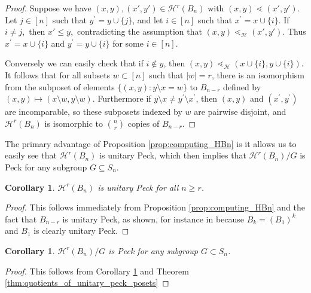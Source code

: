 \documentclass[10 pt]{amsart}
\theoremstyle{plain}
\newtheorem{cor}[thm]{Corollary}
\theoremstyle{definition}
\theoremstyle{remark}
\numberwithin{equation}{section}
\begin{document}
\begin{proof}

Suppose we have $(x, y),(x', y') \in \mathcal H^r(B_n)$ with $(x, y) \lessdot (x', y').$ Let $j\in [n]$ such that $y^\prime = y\cup\{j\}$, and let $i\in [n]$ such that $x^\prime = x\cup \{i\}$. If $i \ne j,$ then $x' \leq y,$ contradicting the assumption that $(x, y) \lessdot_{\mathcal H} (x', y').$ Thus $x^\prime = x\cup\{i\}$ and $y^\prime = y\cup\{i\}$ for some $i\in [n]$.

Conversely we can easily check that if $i\not\in y$, then $(x, y)\lessdot_{\mathcal{H}} (x\cup\{i\}, y\cup\{i\})$.  It follows that for all subsets $w\subset [n]$ such that $|w| = r$, there is an isomorphism from the subposet of elements $\{(x, y)\colon y\setminus x = w\}$ to $B_{n-r}$ defined by $(x,y)\mapsto (x\setminus w,y\setminus w)$.  Furthermore if $y\setminus x \ne y^\prime \setminus x^\prime$, then $(x, y)$ and $(x^\prime, y^\prime)$ are incomparable, so these subposets indexed by $w$ are pairwise disjoint, and $\mathcal{H}^r(B_n)$ is isomorphic to $\binom{n}{r}$ copies of $B_{n-r}$.
\end{proof}



The primary advantage of Proposition \ref{prop:computing_HBn} is it allows us to easily see that $\mathcal{H}^r(B_n)$ is unitary Peck, which then implies that $\mathcal{H}^r(B_n)/G$ is Peck for any subgroup $G\subseteq S_n$.


\begin{cor}\label{cor:HBn_unitary_peck}
$\mathcal{H}^r(B_n)$ is unitary Peck for all $n\ge r$.
\end{cor}

\begin{proof}
This follows immediately from Proposition \ref{prop:computing_HBn} and the fact that $B_{n-r}$ is unitary Peck, as shown, for instance in \cite[Theorem 2a]{quotients_stanley} because $B_k = (B_1)^k$ and $B_1$ is clearly unitary Peck.
\end{proof}

\begin{cor}\label{cor:quotients_of_HBn_peck}
$\mathcal{H}^r(B_n)/G$ is Peck for any subgroup $G\subset S_n$.
\end{cor}

\begin{proof}
This follows from Corollary \ref{cor:HBn_unitary_peck} and Theorem \ref{thm:quotients_of_unitary_peck_posets}
\end{proof}
\end{document}

